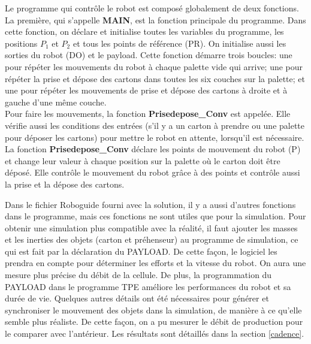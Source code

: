 Le programme qui contrôle le robot est composé globalement de deux fonctions. La première, qui s’appelle \textbf{MAIN}, est la fonction principale du programme. Dans cette fonction, on déclare et initialise toutes les variables du programme, les positions $P_1$ et $P_2$ et tous les points de référence (PR). On initialise aussi les sorties du robot (DO) et le payload. Cette fonction démarre trois boucles: une pour répéter les mouvements du robot à chaque palette vide qui arrive; une pour répéter la prise et dépose des cartons dans toutes les six couches sur la palette; et une pour répéter les mouvements de prise et dépose des cartons à droite et à gauche d’une même couche. \\
Pour faire les mouvements, la fonction \textbf{Prisedepose\_Conv} est appelée. Elle vérifie aussi les conditions des entrées (s’il y a un carton à prendre ou une palette pour déposer les cartons) pour mettre le robot en attente, lorsqu’il est nécessaire.
La fonction \textbf{Prisedepose\_Conv} déclare les points de mouvement du robot (P) et change leur valeur à chaque position sur la palette où le carton doit être déposé. Elle contrôle le mouvement du robot grâce à des points et contrôle aussi la prise et la dépose des cartons.
\par Dans le fichier Roboguide fourni avec la solution, il y a aussi d’autres fonctions dans le programme, mais ces fonctions ne sont utiles que pour la simulation.
Pour obtenir une simulation plus compatible avec la réalité, il faut ajouter les masses et les inerties des objets (carton et préhenseur) au programme de simulation, ce qui est fait par la déclaration du PAYLOAD. De cette façon, le logiciel les prendra en compte pour déterminer les efforts et la vitesse du robot. On aura une mesure plus précise du débit de la cellule. De plus, la programmation du PAYLOAD dans le programme TPE améliore les performances du robot et sa durée de vie.
Quelques autres détails ont été nécessaires pour générer et synchroniser le mouvement des objets dans la simulation, de manière à ce qu’elle semble plus réaliste. De cette façon, on a pu mesurer le débit de production pour le comparer avec l’antérieur. Les résultats sont détaillés dans la section \ref{cadence}.






